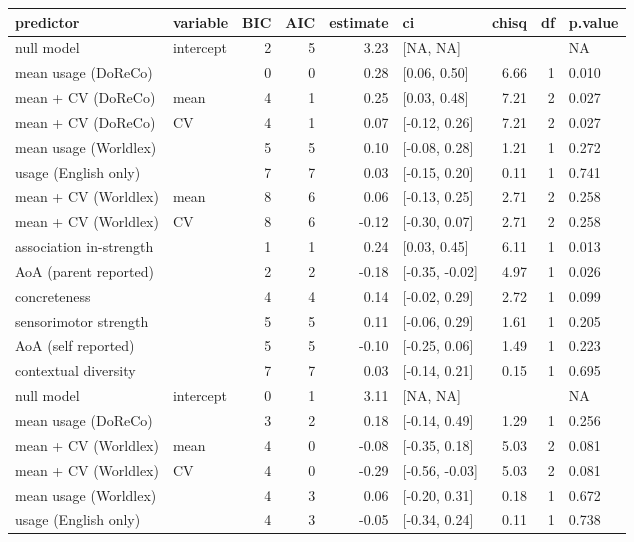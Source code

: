 \begin{table}[ht]
\centering
\begin{tabular}{llrrrlrrl}
  \hline
predictor & variable & BIC & AIC & estimate & ci & chisq & df & p.value \\ 
  \hline
null model & intercept & 2 & 5 & 3.23 & [NA, NA] &  &  & NA \\ 
  mean usage (DoReCo) &  & 0 & 0 & 0.28 & [0.06, 0.50] & 6.66 & 1 & 0.010 \\ 
  mean + CV (DoReCo) & mean & 4 & 1 & 0.25 & [0.03, 0.48] & 7.21 & 2 & 0.027 \\ 
  mean + CV (DoReCo) & CV & 4 & 1 & 0.07 & [-0.12, 0.26] & 7.21 & 2 & 0.027 \\ 
  mean usage (Worldlex) &  & 5 & 5 & 0.10 & [-0.08, 0.28] & 1.21 & 1 & 0.272 \\ 
  usage (English only) &  & 7 & 7 & 0.03 & [-0.15, 0.20] & 0.11 & 1 & 0.741 \\ 
  mean + CV (Worldlex) & mean & 8 & 6 & 0.06 & [-0.13, 0.25] & 2.71 & 2 & 0.258 \\ 
  mean + CV (Worldlex) & CV & 8 & 6 & -0.12 & [-0.30, 0.07] & 2.71 & 2 & 0.258 \\ 
  association in-strength &  & 1 & 1 & 0.24 & [0.03, 0.45] & 6.11 & 1 & 0.013 \\ 
  AoA (parent reported) &  & 2 & 2 & -0.18 & [-0.35, -0.02] & 4.97 & 1 & 0.026 \\ 
  concreteness &  & 4 & 4 & 0.14 & [-0.02, 0.29] & 2.72 & 1 & 0.099 \\ 
  sensorimotor strength &  & 5 & 5 & 0.11 & [-0.06, 0.29] & 1.61 & 1 & 0.205 \\ 
  AoA (self reported) &  & 5 & 5 & -0.10 & [-0.25, 0.06] & 1.49 & 1 & 0.223 \\ 
  contextual diversity &  & 7 & 7 & 0.03 & [-0.14, 0.21] & 0.15 & 1 & 0.695 \\ 
  null model & intercept & 0 & 1 & 3.11 & [NA, NA] &  &  & NA \\ 
  mean usage (DoReCo) &  & 3 & 2 & 0.18 & [-0.14, 0.49] & 1.29 & 1 & 0.256 \\ 
  mean + CV (Worldlex) & mean & 4 & 0 & -0.08 & [-0.35, 0.18] & 5.03 & 2 & 0.081 \\ 
  mean + CV (Worldlex) & CV & 4 & 0 & -0.29 & [-0.56, -0.03] & 5.03 & 2 & 0.081 \\ 
  mean usage (Worldlex) &  & 4 & 3 & 0.06 & [-0.20, 0.31] & 0.18 & 1 & 0.672 \\ 
  usage (English only) &  & 4 & 3 & -0.05 & [-0.34, 0.24] & 0.11 & 1 & 0.738 \\ 

\end{tabular}
\end{table}
